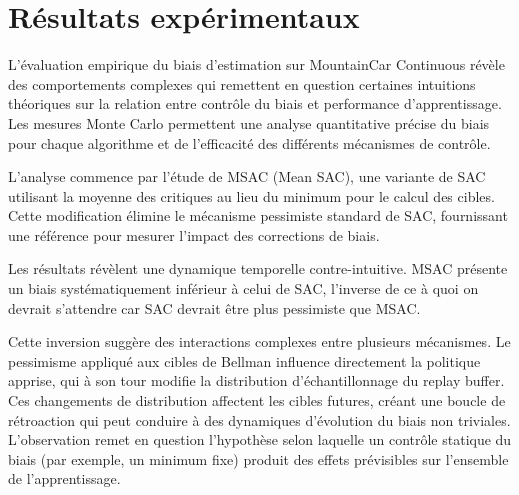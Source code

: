 \documentclass[a4paper, 12pt]{report}
\begin{document}
    \section{Résultats expérimentaux}

    L'évaluation empirique du biais d'estimation sur MountainCar Continuous
    révèle des comportements complexes qui remettent en question certaines
    intuitions théoriques sur la relation entre contrôle du biais et
    performance d'apprentissage. Les mesures Monte Carlo permettent une analyse
    quantitative précise du biais pour chaque algorithme et de l'efficacité des
    différents mécanismes de contrôle.

    L'analyse commence par l'étude de MSAC (Mean SAC), une variante de SAC
    utilisant la moyenne des critiques au lieu du minimum pour le calcul des
    cibles. Cette modification élimine le mécanisme pessimiste standard de SAC,
    fournissant une référence pour mesurer l'impact des corrections de biais.

    Les résultats révèlent une dynamique temporelle contre-intuitive. MSAC
    présente un biais systématiquement inférieur à celui de SAC, l'inverse de ce à quoi on devrait s'attendre car SAC devrait être plus
    pessimiste que MSAC.

    Cette inversion suggère des interactions complexes entre plusieurs
    mécanismes. Le pessimisme appliqué aux cibles de Bellman influence
    directement la politique apprise, qui à son tour modifie la distribution
    d'échantillonnage du replay buffer. Ces changements de distribution
    affectent les cibles futures, créant une boucle de rétroaction qui peut
    conduire à des dynamiques d'évolution du biais non triviales. L'observation
    remet en question l'hypothèse selon laquelle un contrôle statique
    du biais (par exemple, un minimum fixe) produit des effets prévisibles sur
    l'ensemble de l'apprentissage.
\end{document}

